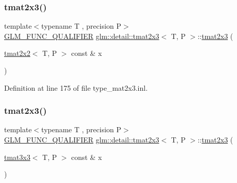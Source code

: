 \mbox{\label{structglm_1_1detail_1_1tmat2x3_a37bd9202b87e73c3d6e36cadce414457}} 
\subsubsection{\texorpdfstring{tmat2x3()}{tmat2x3()}\hspace{0.1cm}{\footnotesize\ttfamily [11/22]}}
{\footnotesize\ttfamily template$<$typename T , precision P$>$ \\
\hyperlink{setup_8hpp_a33fdea6f91c5f834105f7415e2a64407}{G\+L\+M\+\_\+\+F\+U\+N\+C\+\_\+\+Q\+U\+A\+L\+I\+F\+I\+ER} \hyperlink{structglm_1_1detail_1_1tmat2x3}{glm\+::detail\+::tmat2x3}$<$ T, P $>$\+::\hyperlink{structglm_1_1detail_1_1tmat2x3}{tmat2x3} (\begin{DoxyParamCaption}\item[{\hyperlink{structglm_1_1detail_1_1tmat2x2}{tmat2x2}$<$ T, P $>$ const \&}]{x }\end{DoxyParamCaption})\hspace{0.3cm}{\ttfamily [explicit]}}



Definition at line 175 of file type\+\_\+mat2x3.\+inl.

\mbox{\label{structglm_1_1detail_1_1tmat2x3_a1f1c6b71411b314a015c589cbbe34f7a}} 
\subsubsection{\texorpdfstring{tmat2x3()}{tmat2x3()}\hspace{0.1cm}{\footnotesize\ttfamily [12/22]}}
{\footnotesize\ttfamily template$<$typename T , precision P$>$ \\
\hyperlink{setup_8hpp_a33fdea6f91c5f834105f7415e2a64407}{G\+L\+M\+\_\+\+F\+U\+N\+C\+\_\+\+Q\+U\+A\+L\+I\+F\+I\+ER} \hyperlink{structglm_1_1detail_1_1tmat2x3}{glm\+::detail\+::tmat2x3}$<$ T, P $>$\+::\hyperlink{structglm_1_1detail_1_1tmat2x3}{tmat2x3} (\begin{DoxyParamCaption}\item[{\hyperlink{structglm_1_1detail_1_1tmat3x3}{tmat3x3}$<$ T, P $>$ const \&}]{x }\end{DoxyParamCaption})\hspace{0.3cm}{\ttfamily [explicit]}}



